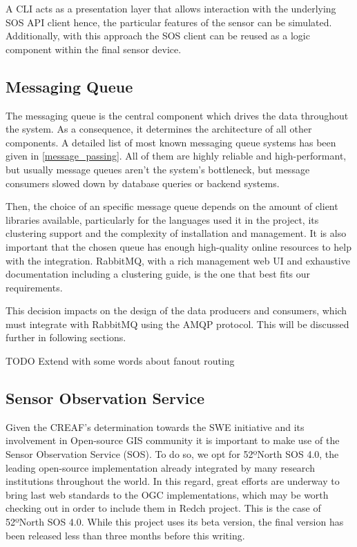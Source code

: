 A CLI acts as a presentation layer that allows interaction with the underlying SOS API client hence, the particular features of the sensor can be simulated. Additionally, with this approach the SOS client can be reused as a logic component within the final sensor device.

\subsection{Messaging Queue}

The messaging queue is the central component which drives the data throughout the system. As a consequence, it determines the architecture of all other components. A detailed list of most known messaging queue systems has been given in \ref{message_passing}. All of them are highly reliable and high-performant, but usually message queues aren't the system's bottleneck, but message consumers slowed down by database queries or backend systems.

Then, the choice of an specific message queue depends on the amount of client libraries available, particularly for the languages used it in the project, its clustering support and the complexity of installation and management. It is also important that the chosen queue has enough high-quality online resources to help with the integration. RabbitMQ, with a rich management web UI and exhaustive documentation including a clustering guide, is the one that best fits our requirements.

This decision impacts on the design of the data producers and consumers, which must integrate with RabbitMQ using the AMQP protocol. This will be discussed further in following sections.

TODO Extend with some words about fanout routing

\subsection{Sensor Observation Service}

Given the CREAF's determination towards the SWE initiative and its involvement in Open-source GIS community it is important to make use of the Sensor Observation Service (SOS). To do so, we opt for 52ºNorth SOS 4.0, the leading open-source implementation already integrated by many research institutions throughout the world. In this regard, great efforts are underway to bring last web standards to the OGC implementations, which may be worth checking out in order to include them in Redch project. This is the case of 52ºNorth SOS 4.0. While this project uses its beta version, the final version has been released less than three months before this writing.


